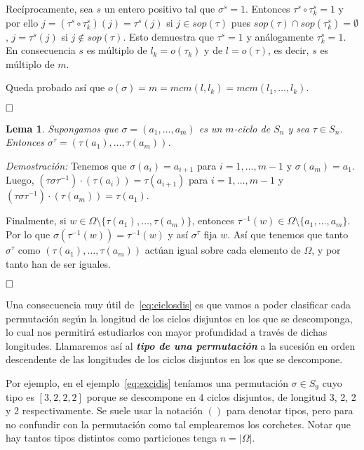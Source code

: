 \documentclass[12pt]{article}
\newtheorem{lemma}{Lema}[theorem]
\begin{document}
Recíprocamente, sea $s$ un entero positivo tal que $\sigma^{s} = 1$. Entonces $\tau^{s} \circ \tau^{s}_{k} = 1$ y por ello $j = (\tau^{s} \circ \tau^{s}_{k})(j) = \tau^{s}(j)$ si $j \in sop(\tau)$ pues $sop(\tau) \cap sop(\tau^{s}_{k}) = \emptyset$, $j = \tau^{s}(j)$ si $j \notin sop(\tau)$. Esto demuestra que $\tau^{s} = 1$ y análogamente $\tau^{s}_{k} = 1$. En consecuencia $s$ es múltiplo de $l_{k} = o(\tau_{k})$ y de $l = o(\tau)$, es decir, $s$ es múltiplo de $m$.

Queda probado así que $o(\sigma)=  m = mcm (l,l_{k}) = mcm(l_{1}, \ldots, l_{k}).$

$\hfill \square$

\begin{lemma} Supongamos que $\sigma = (a_{1}, \ldots, a_{m})$ es un $m$-ciclo de $S_{n}$ y sea $\tau \in S_{n}$. Entonces $\sigma^{\tau}=(\tau(a_{1}), \ldots, \tau(a_{m}))$.
\end{lemma}
\emph{Demostración: }
Tenemos que $\sigma(a_{i})=a_{i+1}$ para $i=1,\ldots, m-1$ y $\sigma(a_{m})=a_{1}$. Luego, $(\tau \sigma \tau^{-1}) \cdot (\tau(a_{i}))=\tau(a_{i+1})$ para $i=1,\ldots, m-1$ y  $(\tau \sigma \tau^{-1}) \cdot (\tau(a_{m}))=\tau(a_{1})$. 

Finalmente, si $w \in \Omega \setminus \lbrace \tau(a_{1}), \ldots, \tau(a_{m})\rbrace$, entonces $\tau^{-1}(w) \in \Omega \setminus \lbrace a_{1}, \ldots, a_{m}\rbrace$. Por lo que $\sigma(\tau^{-1}(w))=\tau^{-1}(w)$ y así $\sigma^{\tau}$ fija $w$. Así que tenemos que tanto $\sigma^{\tau}$ como $(\tau(a_{1}), \ldots, \tau(a_{m}))$ actúan igual sobre cada elemento de $\Omega$, y por tanto han de ser iguales.

$\hfill \square$

Una consecuencia muy útil de~\ref{eq:ciclosdis} es que vamos a poder clasificar cada permutación según la longitud de los ciclos disjuntos en los que se descomponga, lo cual nos permitirá estudiarlos con mayor profundidad a través de dichas longitudes. Llamaremos así al \textbf{\textit{tipo de una permutación}} a la sucesión en orden descendente de las longitudes de los ciclos disjuntos en los que se descompone.

Por ejemplo, en el ejemplo~\ref{eq:excidis} teníamos una permutación $\sigma \in S_{9}$ cuyo tipo es $[3,2,2,2]$ porque se descompone en 4 ciclos disjuntos, de longitud 3, 2, 2 y 2 respectivamente. Se suele usar la notación $()$ para denotar tipos, pero para no confundir con la permutación como tal emplearemos los corchetes. Notar que hay tantos tipos distintos como particiones tenga $n=|\Omega|$.
\end{document}
